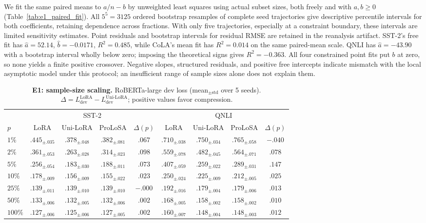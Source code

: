 We fit the same paired means to $a/n-b$ by unweighted least squares using actual subset sizes, both freely and with $a,b\geq0$ (Table~\ref{tab:e1_paired_fit}). All $5^5=3125$ ordered bootstrap resamples of complete seed trajectories give descriptive percentile intervals for both coefficients, retaining dependence across fractions. With only five trajectories, especially at a constraint boundary, these intervals are limited sensitivity estimates. Point residuals and bootstrap intervals for residual RMSE are retained in the reanalysis artifact.
SST-2's free fit has $\hat a=52.14$, $\hat b=-0.0171$, $R^2=0.485$, while CoLA's mean fit has $R^2=0.014$ on the same paired-mean scale. QNLI has $\hat a=-43.90$ with a bootstrap interval wholly below zero; imposing the theoretical signs gives $R^2=-0.363$. All four constrained point fits put $b$ at zero, so none yields a finite positive crossover. Negative slopes, structured residuals, and positive free intercepts indicate mismatch with the local asymptotic model under this protocol; an insufficient range of sample sizes alone does not explain them.

\begin{table}[t]
\centering
\scriptsize
\setlength{\tabcolsep}{3pt}
\caption{\textbf{E1: sample-size scaling.} RoBERTa-large dev loss (mean$_{\pm\mathrm{std}}$ over 5 seeds). $\Delta=L_{\mathrm{dev}}^{\mathrm{LoRA}}-L_{\mathrm{dev}}^{\text{Uni-LoRA}}$; positive values favor compression.}
\label{tab:e1_crossover}
\begin{tabular}{lcccccccc}
\toprule
& \multicolumn{4}{c}{SST-2} & \multicolumn{4}{c}{QNLI} \\
\cmidrule(lr){2-5}\cmidrule(lr){6-9}
$p$ & LoRA & Uni-LoRA & ProLoSA & $\Delta(p)$ & LoRA & Uni-LoRA & ProLoSA & $\Delta(p)$ \\
\midrule
$1\%$   & $.445_{\pm.035}$ & $.378_{\pm.048}$ & $.382_{\pm.081}$ & $.067$  & $.710_{\pm.038}$ & $.750_{\pm.034}$ & $.765_{\pm.058}$ & $-.040$ \\
$2\%$   & $.361_{\pm.053}$ & $.263_{\pm.028}$ & $.314_{\pm.023}$ & $.098$  & $.559_{\pm.078}$ & $.482_{\pm.045}$ & $.564_{\pm.071}$ & $.078$ \\
$5\%$   & $.256_{\pm.054}$ & $.183_{\pm.030}$ & $.188_{\pm.011}$ & $.073$  & $.407_{\pm.059}$ & $.259_{\pm.022}$ & $.289_{\pm.031}$ & $.147$ \\
$10\%$  & $.178_{\pm.009}$ & $.156_{\pm.009}$ & $.155_{\pm.022}$ & $.023$  & $.250_{\pm.024}$ & $.225_{\pm.009}$ & $.212_{\pm.005}$ & $.025$ \\
$25\%$  & $.139_{\pm.011}$ & $.139_{\pm.010}$ & $.139_{\pm.010}$ & $-.000$ & $.192_{\pm.016}$ & $.179_{\pm.004}$ & $.179_{\pm.006}$ & $.013$ \\
$50\%$  & $.133_{\pm.006}$ & $.132_{\pm.005}$ & $.132_{\pm.006}$ & $.002$  & $.168_{\pm.005}$ & $.158_{\pm.002}$ & $.158_{\pm.002}$ & $.010$ \\
$100\%$ & $.127_{\pm.006}$ & $.125_{\pm.006}$ & $.127_{\pm.005}$ & $.002$  & $.160_{\pm.007}$ & $.148_{\pm.004}$ & $.148_{\pm.003}$ & $.012$ \\
\bottomrule
\end{tabular}
\end{table}

